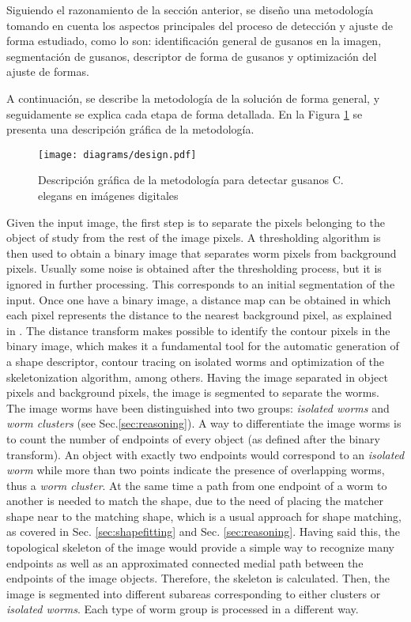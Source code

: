 Siguiendo el razonamiento de la secci\'on anterior, se dise\~no una metodolog\'ia tomando en cuenta
los aspectos principales del proceso de detecci\'on y ajuste de forma estudiado, como lo son:
identificaci\'on general de gusanos en la imagen, segmentaci\'on de gusanos, 
descriptor de forma de gusanos y optimizaci\'on del ajuste de formas.

A continuaci\'on, se describe la metodolog\'ia de la soluci\'on de forma general,  y
seguidamente se explica cada etapa de forma detallada.
En la Figura \ref{fig:methsol} se presenta una descripci\'on gr\'afica de la metodolog\'ia.\\

\begin{figure}[h t b p ! H]
 \centering
   \texttt{[image: diagrams/design.pdf]}
 \caption{Descripci\'on gr\'afica de la metodolog\'ia para detectar gusanos C. elegans
   en im\'agenes digitales}
\label{fig:methsol}
\end{figure}


Given the input image, the first step is to separate the pixels belonging to the object
of study from the rest of the image pixels. A thresholding algorithm is then used to
obtain a binary image that separates worm pixels from background pixels. Usually some
noise is obtained after the thresholding process, but it is ignored in further processing.
This corresponds to an initial segmentation of the input. Once one have a binary image, a
distance map can be obtained in which each pixel represents the distance to the 
nearest background pixel, as explained in \cite{dtresearch}. The distance transform
makes possible to identify the contour pixels in the binary image, which makes it a fundamental
tool for the automatic generation of a shape descriptor, contour tracing on isolated worms 
and optimization of the skeletonization algorithm, among others. Having the image 
separated in object pixels and background pixels, the image is segmented to separate
the worms. \\

The image worms have been distinguished into two groups: \emph{isolated worms}
and \emph{worm clusters} (see Sec.\ref{sec:reasoning}). A way to differentiate the image worms
is to count the number of endpoints of every object (as defined after the binary transform).
An object with exactly two endpoints would correspond to an \emph{isolated worm} while
more than two points indicate the presence of overlapping worms, thus a \emph{worm cluster}.
At the same time a path from one endpoint of a worm to another is needed to match
the shape, due to the need of placing the matcher shape near to the matching shape, which
is a usual approach for shape matching, as covered in Sec. \ref{sec:shapefitting} and
Sec. \ref{sec:reasoning}. Having said this, the topological skeleton of the image 
would provide a simple way to recognize many endpoints as well as an approximated 
connected medial path between the endpoints of the image objects. 
Therefore, the skeleton is calculated. Then, the image is segmented into 
different subareas corresponding to either clusters or \emph{isolated
worms}. Each type of worm group is processed in a different way.

